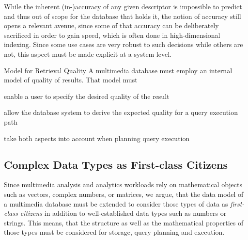 While the inherent (in-)accuracy of any given descriptor is impossible to predict and thus out of scope for the database that holds it, the notion of accuracy still opens a relevant avenue, since some of that accuracy can be deliberately sacrificed in order to gain speed, which is often done in high-dimensional indexing. Since some use cases are very robust to such decisions while others are not, this aspect must be made explicit at a system level.

\begin{requirement}[label=requirement:quality_model]{Model for Retrieval Quality}{}
    A multimedia database must employ an internal model of quality of results. That model must
    \begin{enumerate*}[label=(\roman*),itemjoin={{, }}, itemjoin*={{, and, }}, after={{.}}]
        \item enable a user to specify the desired quality of the result
        \item allow the database system to derive the expected quality for a query execution path
        \item take both aspects into account when planning query execution
    \end{enumerate*}
\end{requirement}

\subsection{Complex Data Types as First-class Citizens}
Since multimedia analysis and analytics workloads rely on mathematical objects such as vectors, complex numbers, or matrices, we argue, that the data model of a multimedia database must be extended to consider those types of data as \emph{first-class citizens} in addition to well-established data types such as numbers or strings. This means, that the structure as well as the mathematical properties of those types must be considered for storage, query planning and execution.

